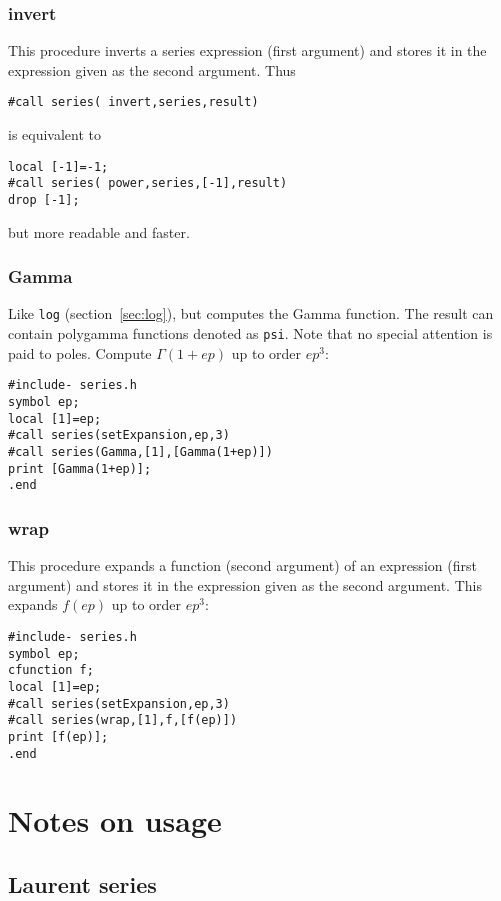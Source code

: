 \documentclass[titlepage]{article}
\begin{document}
\subsubsection{invert}
\label{sec:invert}

This procedure inverts a series expression (first argument) and stores
it in the expression given as the second argument. Thus
\begin{lstlisting}
#call series( invert,series,result)
\end{lstlisting}
is equivalent to
\begin{lstlisting}
local [-1]=-1;
#call series( power,series,[-1],result)
drop [-1];
\end{lstlisting}
but more readable and faster.

\subsubsection{Gamma}
\label{sec:gamma}

Like {\tt log} (section~\ref{sec:log}), but computes the
Gamma function. The result can contain polygamma functions denoted as
{\tt psi}. Note that no special attention is paid to poles.
Compute $\Gamma(1+ep)$ up to order $ep^3$:
\begin{lstlisting}
#include- series.h
symbol ep;
local [1]=ep;
#call series(setExpansion,ep,3)
#call series(Gamma,[1],[Gamma(1+ep)])
print [Gamma(1+ep)];
.end
\end{lstlisting}


\subsubsection{wrap}
\label{sec:wrap}

This procedure expands a function (second argument) of an expression
(first argument)
and stores it in the expression given as the second argument.
This expands $f(ep)$ up to order $ep^3$:
\begin{lstlisting}
#include- series.h
symbol ep;
cfunction f;
local [1]=ep;
#call series(setExpansion,ep,3)
#call series(wrap,[1],f,[f(ep)])
print [f(ep)];
.end
\end{lstlisting}

\section{Notes on usage}
\label{sec:usage_notes}

\subsection{Laurent series}
\label{sec:laurent}
\end{document}
